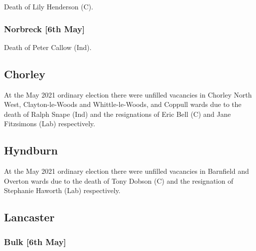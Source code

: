 \documentclass[a4paper,openany]{book}
\begin{document}
\begin{resultsiii}

Death of Lily Henderson (C).

\subsubsection*{Norbreck \hspace*{\fill}\nolinebreak[1]%
	\enspace\hspace*{\fill}
	[6th May]}


Death of Peter Callow (Ind).

\subsection*{Chorley}

At the May 2021 ordinary election there were unfilled vacancies in Chorley North West, Clayton-le-Woods and Whittle-le-Woods, and Coppull wards due to the death of Ralph Snape (Ind) and the resignations of Eric Bell (C) and Jane Fitzsimons (Lab) respectively.

\subsection*{Hyndburn}

At the May 2021 ordinary election there were unfilled vacancies in Barnfield and Overton wards due to the death of Tony Dobson (C) and the resignation of Stephanie Haworth (Lab) respectively.

\subsection*{Lancaster}

\subsubsection*{Bulk \hspace*{\fill}\nolinebreak[1]%
	\enspace\hspace*{\fill}
	[6th May]}


\end{resultsiii}
\end{document}
